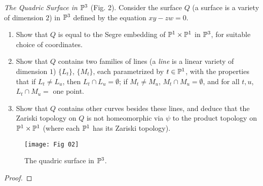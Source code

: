 \label{1.2.15}

\textit{The Quadric Surface in $\P^3$} (Fig. 2). Consider the surface $Q$ (a surface is a variety of dimension $2$) in $\P^3$ defined by the equation $xy - zw = 0$.

\begin{enumerate}[label = (\alph*)]
    \item Show that $Q$ is equal to the Segre embedding of $\P^1 \times \P^1$ in $\P^3$, for suitable choice of coordinates.
    
    \item Show that $Q$ contains two families of lines (a \textit{line} is a linear variety of dimension $1$) $\{L_t\}$, $\{M_t\}$, each parametrized by $t \in \P^1$, with the properties that if $L_t \neq L_u$, then $L_t \cap L_u = \emptyset$; if $M_t \neq M_u$, $M_t \cap M_u = \emptyset$, and for all $t, u$, $L_t \cap M_u = $ one point.
    
    \item Show that $Q$ contains other curves besides these lines, and deduce that the Zariski topology on $Q$ is not homeomorphic via $\psi$ to the product topology on $\P^1 \times \P^1$ (where each $\P^1$ has its Zariski topology).
\end{enumerate}

\begin{figure}
    \centering
    \texttt{[image: Fig 02]}
    \caption{The quadric surface in $\P^3$.}
    \label{Fig. 1}
\end{figure}

\begin{proof}
    
\end{proof}